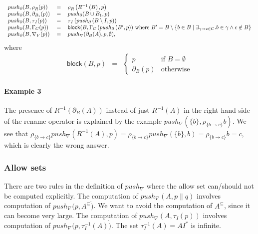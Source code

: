 \documentclass{article}
\begin{document}
\[\begin{tabular}{lll}
$push_{\partial }(B,\rho _{R}(p))$ & $=$ & $\rho _{R}\left( R^{-1}\left(
B\right) ,p\right) $ \\ 
$push_{\partial }(B,\partial _{B_{1}}(p))$ & $=$ & $push_{\partial }(B\cup
B_{1},p)$ \\ 
$push_{\partial }(B,\tau _{I}(p))$ & $=$ & $\tau _{I}\left( push_{\partial
}\left( B\setminus I,p\right) \right) $ \\ 
$push_{\partial }(B,\Gamma _{C}(p))$ & $=$ & $\mathsf{block}(B,\Gamma
_{C}\left( push_{\partial }\left( B^{\prime },p\right) \right) $ where $%
B^{\prime }=B\setminus \left\{ b\in B\mid \exists _{\gamma \rightarrow c\in
C}.b\in \gamma \wedge c\notin B\right\} $ \\ 
$push_{\partial }(B,\nabla _{V}(p))$ & $=$ & $push_{\nabla }(\partial
_{B}(A),p,\emptyset ),$%
\end{tabular}%
\]%
where%
\[
\begin{array}{lll}
\mathsf{block}(B,p) & = & \left\{ 
\begin{array}{ll}
p & \text{if }B=\emptyset \\ 
\partial _{B}(p) & \text{otherwise}%
\end{array}%
\right.%
\end{array}%
\]

\paragraph{Example 3}

The presence of $R^{-1}(\partial _{B}(A))$ instead of just $R^{-1}(A)$ in
the right hand side of the rename operator is explained by the example $%
push_{\nabla }(\{b\},\rho _{\{b\rightarrow c\}}b)$. We see that $\rho
_{\{b\rightarrow c\}}push_{\nabla }(R^{-1}(A),p)=\rho _{\{b\rightarrow
c\}}push_{\nabla }(\{b\},b)=\rho _{\{b\rightarrow c\}}b=c$, which is clearly
the wrong answer.

\subsubsection{Allow sets}

There are two rules in the definition of $push_{\nabla }$ where the allow
set can/should not be computed explicitly. The computation of $push_{\nabla
}(A,p\parallel q)$ involves computation of $push_{\nabla }(p,A^{\subseteq }%
\dot{)}$. We want to avoid the computation of $A^{\subseteq }$, since it can
become very large. The computation of $push_{\nabla }(A,\tau _{I}(p))$
involves computation of $push_{\nabla }(p,\tau _{I}^{-1}(A)\dot{)}$. The set 
$\tau _{I}^{-1}(A)=AI^{\ast }$ is infinite.
\end{document}
